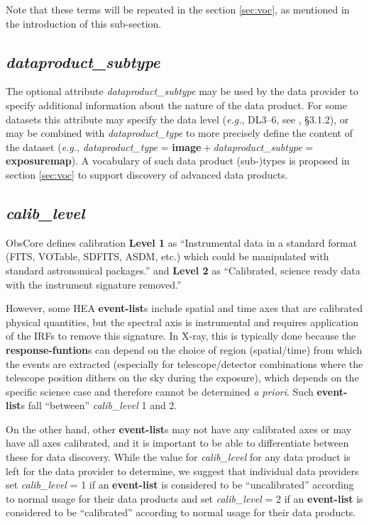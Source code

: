 \documentclass[11pt,a4paper]{ivoa}
\begin{document}
Note that these terms will be repeated in the section \ref{sec:voc}, as mentioned in the introduction of this sub-section.

\subsection{{\em dataproduct\_subtype}}

The optional attribute {\em dataproduct\_subtype} may be used by the data provider to specify additional information about the nature of the data product. For some datasets this attribute may specify the data level ({\em e.g.\/}, DL3--6, see \citealt{2024ivoa.note.heig}, \S3.1.2), or may be combined with {\em dataproduct\_type\/} to more precisely define the content of the dataset ({\em e.g.\/}, {\em dataproduct\_type\/} = {\bf image}${}+{}${\em dataproduct\_subtype\/} = {\bf exposuremap}). A vocabulary of such data product (sub-)types is proposed in section \ref{sec:voc} to support discovery of advanced data products.


\subsection{{\em calib\_level}}

ObsCore defines calibration {\bf Level 1} as ``Instrumental data in a standard format (FITS, VOTable, SDFITS, ASDM, etc.) which could be manipulated with standard astronomical packages.'' and {\bf Level 2} as ``Calibrated, science ready data with the instrument signature removed.''

However, some \gls{HEA} {\bf event-list}s include spatial and time axes that are calibrated physical quantities, but the spectral axis is instrumental and requires application of the IRFs to remove this signature. In X-ray, this is typically done because the {\bf response-funtion}s can depend on the choice of region (spatial/time) from which the events are extracted (especially for telescope/detector combinations where the telescope position dithers on the sky during the exposure), which depends on the specific science case and therefore cannot be determined {\em a priori\/}.  Such {\bf event-list}s fall ``between'' {\em calib\_level\/} 1 and 2.

On the other hand, other {\bf event-list}s may not have any calibrated axes or may have all axes calibrated, and it is important to be able to differentiate between these for data discovery.  While the value for {\em calib\_level\/} for any data product is left for the data provider to determine, we suggest that individual data providers set {\em calib\_level\/} = 1 if an {\bf event-list} is considered to be ``uncalibrated'' according to normal usage for their data products and set {\em calib\_level\/} = 2 if an {\bf event-list} is considered to be ``calibrated'' according to normal usage for their data products.
\end{document}
